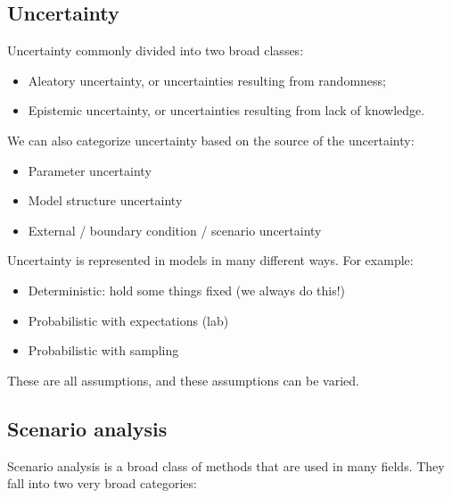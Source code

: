 \documentclass[
  letterpaper,
  DIV=11,
  numbers=noendperiod]{scrreprt}
\providecommand{\tightlist}{%
  \setlength{\itemsep}{0pt}\setlength{\parskip}{0pt}}
\begin{document}
\subsection{Uncertainty}\label{uncertainty}

Uncertainty commonly divided into two broad classes:

\begin{itemize}
\tightlist
\item
  Aleatory uncertainty, or uncertainties resulting from randomness;
\item
  Epistemic uncertainty, or uncertainties resulting from lack of
  knowledge.
\end{itemize}

We can also categorize uncertainty based on the source of the
uncertainty:

\begin{itemize}
\tightlist
\item
  Parameter uncertainty
\item
  Model structure uncertainty
\item
  External / boundary condition / scenario uncertainty
\end{itemize}

Uncertainty is represented in models in many different ways. For
example:

\begin{itemize}
\tightlist
\item
  Deterministic: hold some things fixed (we always do this!)
\item
  Probabilistic with expectations (lab)
\item
  Probabilistic with sampling
\end{itemize}

These are all assumptions, and these assumptions can be varied.

\subsection{Scenario analysis}\label{scenario-analysis-1}

Scenario analysis is a broad class of methods that are used in many
fields. They fall into two very broad categories:
\end{document}
